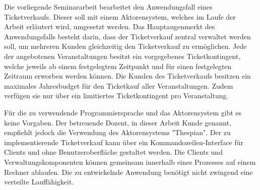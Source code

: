 Die vorliegende Seminararbeit bearbeitet den Anwendungsfall eines Ticketverkaufs. 
Dieser soll mit einem Aktorensystem, welches im Laufe der Arbeit erläutert wird, umgesetzt werden.
Das Hauptaugenmerkt des Anwendungsfalls besteht darin, dass der Ticketverkauf zentral verwaltet werden soll, um mehreren Kunden gleichzeitig den Ticketverkauf zu ermöglichen.
Jede der angebotenen Veranstaltungen besitzt ein vorgegebenes Ticketkontingent, welche jeweils ab einem festgelegtem Zeitpunkt und für einen festgelegten Zeitraum erworben werden können.
Die Kunden des Ticketverkaufs besitzen ein maximales Jahresbudget für den Ticketkauf aller Veranstaltungen. Zudem verfügen sie nur über ein limitiertes Ticketkontingent pro Veranstaltung.

Für die zu verwendende Programmiersprache und das Aktorensystem gibt es keine Vorgaben.
Der betreuende Dozent, in dieser Arbeit Kunde genannt, empfiehlt jedoch die Verwendung des Aktorensystems "Thespian".
Der zu implementierende Ticketverkauf kann über ein Kommandozeilen-Interface für Clients und ohne Benutzeroberfläche gestaltet werden.
Die Clients und Verwaltungskomponenten können gemeinsam innerhalb eines Prozesses auf einem Rechner ablaufen.
Die zu entwickelnde Anwendung benötigt nicht zwingend eine verteilte Lauffähigkeit.

